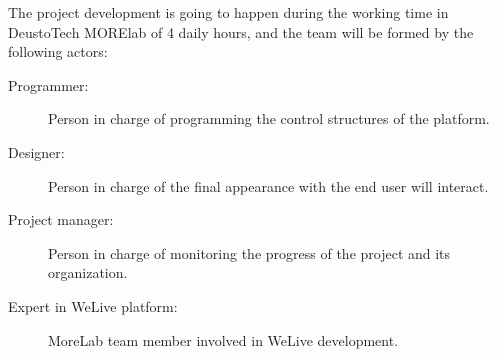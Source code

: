 \documentclass{DeustoFDP}
\begin{document}
The project development is going to happen during the working time in DeustoTech MORElab of 4 daily hours, and the team will be formed by the following actors:

\begin{description}
	\item[Programmer:] Person in charge of programming the control structures of the platform.
	\item[Designer:] Person in charge of the final appearance with the end user will interact.
	\item[Project manager:] Person in charge of monitoring the progress of the project and its organization.
	\item[Expert in WeLive platform:] MoreLab team member involved in WeLive development.
\end{description}

\newpage
\end{document}
